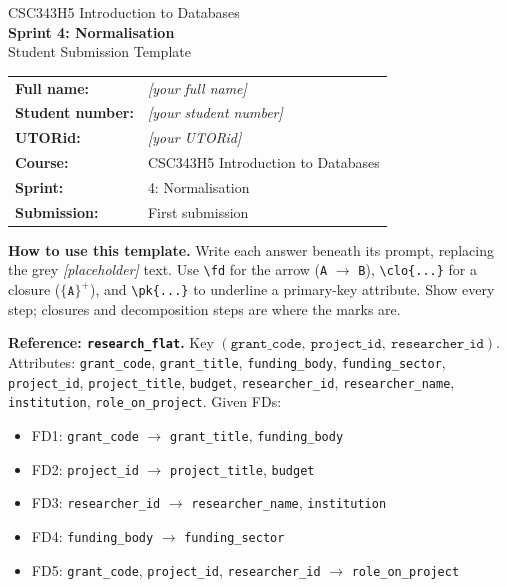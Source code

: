\documentclass[11pt, letterpaper]{article}
\newcommand{\attr}[1]{\texttt{#1}}
\newcommand{\fd}{\ensuremath{\rightarrow}}
\newcommand{\clo}[1]{\ensuremath{\{#1\}^{+}}}
\newcommand{\pk}[1]{\underline{\texttt{#1}}}          %
\newcommand{\todo}[1]{{\color{muted}\textit{[#1]}}}    %
\begin{document}
\begin{center}
  {\small\color{muted}CSC343H5 Introduction to Databases}\\[4pt]
  {\LARGE\bfseries\color{dark}Sprint 4: Normalisation}\\[4pt]
  {\small\color{muted}Student Submission Template}
\end{center}
\vspace{6pt}

\begin{tabular}{@{}ll@{}}
  \textbf{Full name:}      & \todo{your full name} \\
  \textbf{Student number:} & \todo{your student number} \\
  \textbf{UTORid:}         & \todo{your UTORid} \\
  \textbf{Course:}         & CSC343H5 Introduction to Databases \\
  \textbf{Sprint:}         & 4: Normalisation \\
  \textbf{Submission:}     & First submission \\
\end{tabular}

\vspace{8pt}

\textbf{How to use this template.} Write each answer beneath its prompt, replacing the grey \todo{placeholder} text. Use \verb|\fd| for the arrow (\attr{A} \fd{} \attr{B}), \verb|\clo{...}| for a closure ($\clo{\attr{A}}$), and \verb|\pk{...}| to underline a primary-key attribute. Show every step; closures and decomposition steps are where the marks are.

\medskip
\textbf{Reference: \attr{research\_flat}.} Key
$(\attr{grant\_code},\ \attr{project\_id},\ \attr{researcher\_id})$. Attributes:
\attr{grant\_code}, \attr{grant\_title}, \attr{funding\_body}, \attr{funding\_sector},
\attr{project\_id}, \attr{project\_title}, \attr{budget}, \attr{researcher\_id},
\attr{researcher\_name}, \attr{institution}, \attr{role\_on\_project}. Given FDs:

\begin{itemize}[itemsep=1pt, topsep=2pt]
  \item FD1: \attr{grant\_code} \fd{} \attr{grant\_title}, \attr{funding\_body}
  \item FD2: \attr{project\_id} \fd{} \attr{project\_title}, \attr{budget}
  \item FD3: \attr{researcher\_id} \fd{} \attr{researcher\_name}, \attr{institution}
  \item FD4: \attr{funding\_body} \fd{} \attr{funding\_sector}
  \item FD5: \attr{grant\_code}, \attr{project\_id}, \attr{researcher\_id} \fd{} \attr{role\_on\_project}
\end{itemize}
\end{document}
